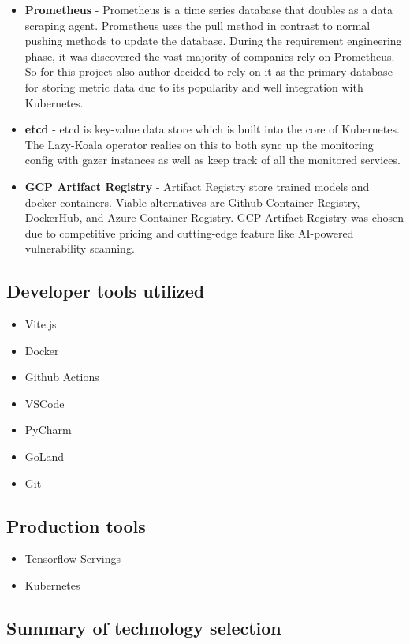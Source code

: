 \begin{itemize}
    \item \textbf{Prometheus} - Prometheus is a time series database that doubles as a data scraping agent. Prometheus uses the pull method in contrast to normal pushing methods to update the database. During the requirement engineering phase, it was discovered the vast majority of companies rely on Prometheus. So for this project also author decided to rely on it as the primary database for storing metric data due to its popularity and well integration with Kubernetes.
    \item \textbf{etcd} - etcd is key-value data store which is built into the core of Kubernetes. The Lazy-Koala operator realies on this to both sync up the monitoring config with gazer instances as well as keep track of all the monitored services.
    \item \textbf{GCP Artifact Registry} - Artifact Registry store trained models and docker containers. Viable alternatives are Github Container Registry, DockerHub, and Azure Container Registry. GCP Artifact Registry was chosen due to competitive pricing and cutting-edge feature like AI-powered vulnerability scanning. 
\end{itemize}

\subsection{Developer tools utilized}
\begin{itemize}
    \item Vite.js
    \item Docker
    \item Github Actions
    \item VSCode
    \item PyCharm
    \item GoLand
    \item Git
\end{itemize}

\subsection{Production tools}
\begin{itemize}
    \item Tensorflow Servings
    \item Kubernetes
\end{itemize}

\subsection{Summary of technology selection}

